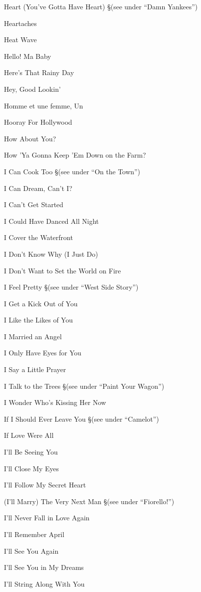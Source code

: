 \N Heart (You've Gotta Have Heart)
\nobreak
\S (see under ``Damn Yankees'')

\N Heartaches

\N Heat Wave

\N Hello! Ma Baby

\N Here's That Rainy Day

\N Hey, Good Lookin'

\N Homme et une femme, Un

\N Hooray For Hollywood

\N How About You?

\N How 'Ya Gonna Keep 'Em Down on the Farm?

\N I Can Cook Too
\nobreak
\S (see under ``On the Town'')

\N I Can Dream, Can't I?

\N I Can't Get Started

\N I Could Have Danced All Night

\N I Cover the Waterfront

\N I Don't Know Why (I Just Do)

\N I Don't Want to Set the World on Fire

\N I Feel Pretty
\nobreak
\S (see under ``West Side Story'')

\N I Get a Kick Out of You

\N I Like the Likes of You

\N I Married an Angel

\N I Only Have Eyes for You

\N I Say a Little Prayer

\N I Talk to the Trees
\nobreak
\S (see under ``Paint Your Wagon'')

\N I Wonder Who's Kissing Her Now

\N If I Should Ever Leave You
\nobreak
\S (see under ``Camelot'')

\N If Love Were All

\N I'll Be Seeing You

\N I'll Close My Eyes

\N I'll Follow My Secret Heart

\N (I'll Marry) The Very Next Man
\nobreak
\S (see under ``Fiorello!'')

\N I'll Never Fall in Love Again

\N I'll Remember April

\N I'll See You Again

\N I'll See You in My Dreams

\N I'll String Along With You

